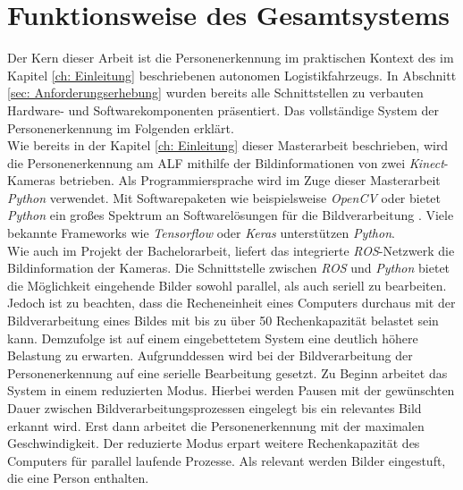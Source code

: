 	
	
	
	 
	
	\section{Funktionsweise des Gesamtsystems}
	\label{sec: Funktionsweise des Gesamtsystems}
		
	Der Kern dieser Arbeit ist die Personenerkennung im praktischen Kontext des im Kapitel \ref{ch: Einleitung} beschriebenen autonomen Logistikfahrzeugs. In Abschnitt \ref{sec: Anforderungserhebung} wurden bereits alle Schnittstellen zu verbauten Hardware- und Softwarekomponenten präsentiert. Das vollständige System der Personenerkennung im Folgenden erklärt.\\
	
	Wie bereits in der Kapitel \ref{ch: Einleitung} dieser Masterarbeit beschrieben, wird die Personenerkennung am ALF mithilfe der Bildinformationen von zwei \textit{Kinect}-Kameras betrieben. Als Programmiersprache wird im Zuge dieser Masterarbeit \textit{Python} verwendet. Mit Softwarepaketen wie beispielsweise \textit{OpenCV} oder  bietet \textit{Python} ein großes Spektrum an Softwarelösungen für die Bildverarbeitung \cite{opencv}\cite{pillow}. Viele bekannte Frameworks wie \textit{Tensorflow} oder \textit{Keras} unterstützen \textit{Python}.\\
	
	Wie auch im Projekt der Bachelorarbeit, liefert das integrierte \textit{ROS}-Netzwerk die Bildinformation der Kameras. Die Schnittstelle zwischen \textit{ROS} und \textit{Python} bietet die Möglichkeit eingehende Bilder sowohl parallel, als auch seriell zu bearbeiten. Jedoch ist zu beachten, dass die Recheneinheit eines Computers durchaus mit der Bildverarbeitung eines Bildes mit bis zu über 50 \percent Rechenkapazität belastet sein kann. Demzufolge ist auf einem eingebettetem System eine deutlich höhere Belastung zu erwarten. Aufgrunddessen wird bei der Bildverarbeitung der Personenerkennung auf eine serielle Bearbeitung gesetzt. Zu Beginn arbeitet das System in einem reduzierten Modus. Hierbei werden Pausen mit der gewünschten Dauer zwischen Bildverarbeitungsprozessen eingelegt bis ein relevantes Bild erkannt wird. Erst dann arbeitet die Personenerkennung mit der maximalen Geschwindigkeit. Der reduzierte Modus erpart weitere Rechenkapazität des Computers für parallel laufende Prozesse. Als relevant werden Bilder eingestuft, die eine Person enthalten.\\
	

